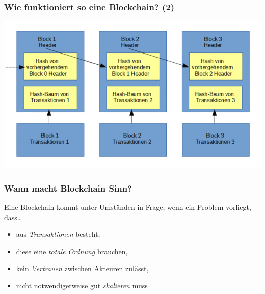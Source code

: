 \documentclass[aspectratio=169,x11names]{beamer}
\begin{document}
\begin{frame}
\frametitle{Wie funktioniert so eine \glqq Blockchain\grqq ? (2)}
\begin{center}
\includegraphics[scale=2]{images/BlockChain_D.png} 
\end{center}
\end{frame}


\begin{frame}
\frametitle{Wann macht Blockchain Sinn?}

Eine Blockchain kommt unter Umständen in Frage, wenn ein Problem vorliegt, dass\dots
\bigskip

\begin{itemize}
\pause\item aus \emph{Transaktionen} besteht,
\pause\item diese eine \emph{totale Ordnung} brauchen,
\pause\item kein \emph{Vertrauen} zwischen Akteuren zulässt,
\pause\item nicht notwendigerweise gut \emph{skalieren} muss 
\end{itemize}
\end{frame}

\end{document}
